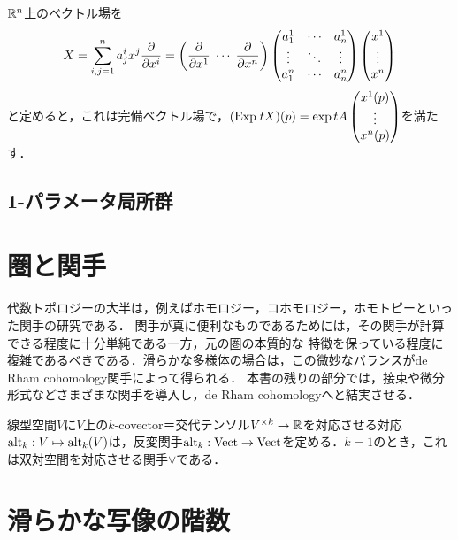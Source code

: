 \documentclass[uplatex,dvipdfmx]{jsreport}
\begin{document}
\begin{example}[無限小線型変換]
    $\mathbb{R}^n$上のベクトル場を
    \[X=\sum_{i,j=1}^na^i_jx^j\frac{\partial }{\partial x^i}=\left(\frac{\partial }{\partial x^1}\;\cdots\;\frac{\partial }{\partial x^n}\right)\begin{pmatrix}a^1_1&\cdots&a^1_n\\\vdots&\ddots&\vdots\\a^n_1&\cdots&a^n_n\end{pmatrix}\begin{pmatrix}x^1\\\vdots\\x^n\end{pmatrix}\]
    と定めると，これは完備ベクトル場で，$(\mathrm{Exp}\; tX)(p)=\exp tA\begin{pmatrix}x^1(p)\\\vdots\\x^n(p)\end{pmatrix}$を満たす．
\end{example}

\subsection{1-パラメータ局所群}

\section{圏と関手}

\begin{tcolorbox}[colframe=ForestGreen, colback=ForestGreen!10!white,breakable,colbacktitle=ForestGreen!40!white,coltitle=black,fonttitle=\bfseries\sffamily,
title=]
    代数トポロジーの大半は，例えばホモロジー，コホモロジー，ホモトピーといった関手の研究である．
    関手が真に便利なものであるためには，その関手が計算できる程度に十分単純である一方，元の圏の本質的な
    特徴を保っている程度に複雑であるべきである．滑らかな多様体の場合は，この微妙なバランスがde Rham cohomology関手によって得られる．
    本書の残りの部分では，接束や微分形式などさまざまな関手を導入し，de Rham cohomologyへと結実させる．
\end{tcolorbox}

\begin{definition}[交代テンソル関手]
    線型空間$V$に$V$上の$k$-covector＝交代テンソル$V^{\times k}\to\mathbb{R}$を対応させる対応$\mathrm{alt}_k:V\mapsto\mathrm{alt}_k(V)$は，反変関手$\mathrm{alt}_k:\mathrm{Vect}\to\mathrm{Vect}$を定める．$k=1$のとき，これは双対空間を対応させる関手$\vee$である．
\end{definition}

\section{滑らかな写像の階数}
\end{document}
